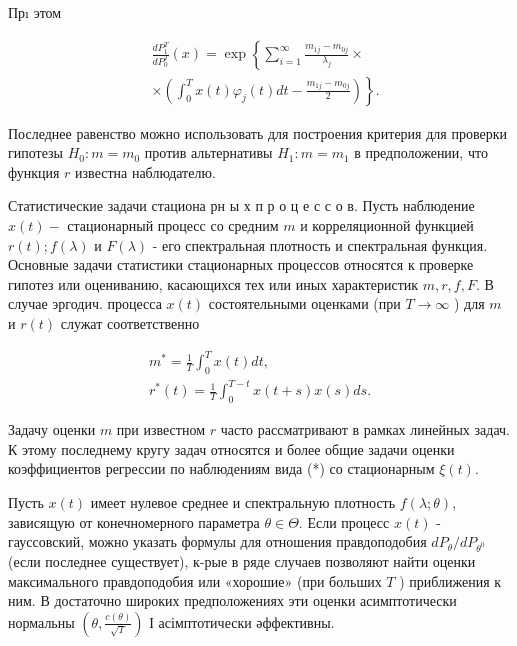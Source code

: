 \documentclass[10pt]{article}
\begin{document}
Прı этом



\[

\begin{aligned}

& \frac{d P_{1}^{T}}{d P_{0}^{T}}(x)=\exp \left\{\sum_{i=1}^{\infty} \frac{m_{1 j}-m_{0 j}}{\lambda_{j}} \times\right. \\

& \left.\times\left(\int_{0}^{T} x(t) \varphi_{j}(t) d t-\frac{m_{1 j}-m_{0 j}}{2}\right)\right\} .

\end{aligned}

\]



Последнее равенство можно использовать для построения критерия для проверки гипотезы $H_{0}: m=m_{0}$ против альтернативы $H_{1}: m=m_{1}$ в предположении, что функция $r$ известна наблюдателю.



Статистические задачи стациона рн ы х п р о ц е с с о в. Пусть наблюдение $x(t)-$ стационарный процесс со средним $m$ и корреляционной функцией $r(t) ; f(\lambda)$ и $F(\lambda)$ - его спектральная плотность и спектральная функция. Основные задачи статистики стационарных процессов относятся к проверке гипотез или оцениванию, касающихся тех или иных характеристик $m, r, f, F$. В случае эргодич. процесса $x(t)$ состоятельными оценками (при $T \rightarrow \infty$ ) для $m$ и $r(t)$ служат соответственно



\[

\begin{gathered}

m^{*}=\frac{1}{T} \int_{0}^{T} x(t) d t, \\

r^{*}(t)=\frac{1}{T} \int_{0}^{T-t} x(t+s) x(s) d s .

\end{gathered}

\]



Задачу оценки $m$ при известном $r$ часто рассматривают в рамках линейных задач. К этому последнему кругу задач относятся и более общие задачи оценки коэффициентов регрессии по наблюдениям вида (*) со стационарным $\xi(t)$.



Пусть $x(t)$ имеет нулевое среднее и спектральную плотность $f(\lambda ; \theta)$, зависящую от конечномерного параметра $\theta \in \Theta$. Если процесс $x(t)$ - гауссовский, можно указать формулы для отношения правдоподобия $d P_{\theta} / d P_{\theta^{0}}$ (если последнее существует), к-рые в ряде случаев позволяют найти оценки максимального правдоподобия или «хорошие» (при больших $T$ ) приближения к ним. В достаточно широких предположениях эти оценки асимптотически нормальны $\left(\theta, \frac{c(\theta)}{\sqrt{T}}\right)$ І асімптотически әффективны.
\end{document}
